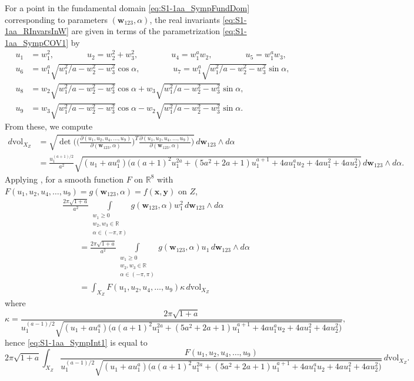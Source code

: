 \documentclass[twoside]{amsart}
\theoremstyle{definition}
\theoremstyle{remark}
\numberwithin{equation}{section}
\newcommand{\R}{\mathbb{R}}
\newcommand{\vol}{\text{vol}}
\begin{document}
For a point in the fundamental domain \eqref{eq:S1-1aa_SympFundDom} corresponding to parameters $(\mathbf{w}_{123}, \alpha)$, the real invariants
\eqref{eq:S1-1aa_RInvarsInW} are given in terms of the parametrization \eqref{eq:S1-1aa_SympCOV1} by
\begin{equation}
\label{eq:S1-1aa_SympRInvarsInW}
\begin{aligned}
    u_1 &=      w_1^2,
    \qquad\qquad
    u_2 =       w_2^2 + w_3^2,
    \qquad\qquad
    u_4 =       w_1^a w_2,
    \qquad\qquad
    u_5 =       w_1^a w_3,
    \\
    u_6 &=      w_1^a \sqrt{w_1^2/a - w_2^2 - w_3^2}\cos\alpha,
    \qquad\qquad
    u_7 =       w_1^a \sqrt{w_1^2/a - w_2^2 - w_3^2}\sin\alpha,
    \\
    u_8 &=      w_2 \sqrt{w_1^2/a - w_2^2 - w_3^2}\cos\alpha + w_3 \sqrt{w_1^2/a - w_2^2 - w_3^2}\sin\alpha,
    \\
    u_9 &=      w_3 \sqrt{w_1^2/a - w_2^2 - w_3^2}\cos\alpha - w_2\sqrt{w_1^2/a - w_2^2 - w_3^2}\sin\alpha.
\end{aligned}
\end{equation}
From these, we compute
\begin{align*}
    d\vol_{X_Z}
    &=
    \sqrt{\det\Bigg(\Big(\frac{\partial (u_1, u_2, u_4,\ldots,u_9)}{ \partial (\mathbf{w}_{123}, \alpha)}\Big)^T
        \frac{\partial (u_1, u_2, u_4,\ldots,u_9)}{ \partial (\mathbf{w}_{123}, \alpha)}\Bigg) }
    \, d\mathbf{w}_{123}\wedge d\alpha
    \\&=
    \frac{u_1^{(a + 1)/2} }{a^2} \sqrt{ (u_1 + a u_1^a)\big(a(a + 1)^2 u_1^{2a} + (5a^2 + 2a + 1) u_1^{a + 1} + 4a u_1^a u_2 + 4a u_1^2 + 4a u_2^2 \big) }
     \, d\mathbf{w}_{123}\wedge d\alpha.
\end{align*}
Applying \cite[Thrm.~1]{GWSdiff}, for a smooth function $F$ on $\R^8$ with $F(u_1, u_2, u_4,\ldots, u_9) = g(\mathbf{w}_{123}, \alpha) = f(\mathbf{x}, \mathbf{y})$
on $Z$,
\begin{align*}
    &\frac{2\pi\sqrt{1 + a}}{a^2}  \int\limits_{\substack{w_1 \geq 0 \\ w_2, w_3\in\R \\ \alpha\in(-\pi,\pi)}} g(\mathbf{w}_{123},\alpha)
        w_1^2 \, d\mathbf{w}_{123} \wedge d\alpha
    \\&\qquad=
    \frac{2\pi\sqrt{1 + a}}{a^2}  \int\limits_{\substack{w_1 \geq 0 \\ w_2, w_3\in\R \\ \alpha\in(-\pi,\pi)}} g(\mathbf{w}_{123},\alpha)
            u_1 \, d\mathbf{w}_{123} \wedge d\alpha
    \\&\qquad=
    \int_{X_Z} F(u_1, u_2, u_4,\ldots, u_9) \kappa \, d\vol_{X_Z}
\end{align*}
where
\[
    \kappa
    =
    \frac{2\pi\sqrt{1 + a}}
        {u_1^{(a - 1)/2}
            \sqrt{ (u_1 + a u_1^a)\big(a(a + 1)^2 u_1^{2a} + (5a^2 + 2a + 1) u_1^{a + 1} + 4a u_1^a u_2 + 4a u_1^2 + 4a u_2^2 \big) } },
\]
hence \eqref{eq:S1-1aa_SympInt1} is equal to
\[
    2\pi\sqrt{1 + a} \int_{X_Z}
        \frac{ F(u_1, u_2, u_4,\ldots, u_9) }
        { u_1^{(a - 1)/2} \sqrt{ (u_1 + a u_1^a)\big(a(a + 1)^2 u_1^{2a} + (5a^2 + 2a + 1) u_1^{a + 1} + 4a u_1^a u_2 + 4a u_1^2 + 4a u_2^2 \big) } }
            \, d\vol_{X_Z}.
\]
\end{document}
